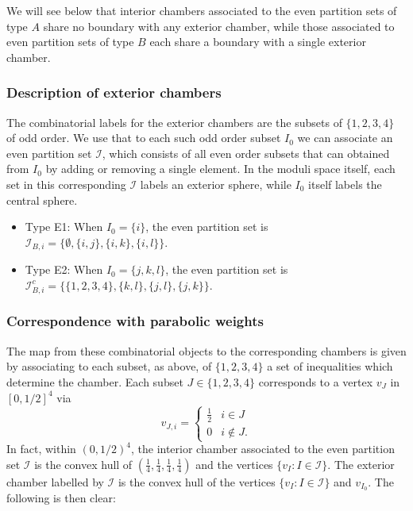 \documentclass[12pt,letterpaper,reqno]{amsart}
\theoremstyle{remark}
\theoremstyle{definition}
\numberwithin{thm}{section}
\numberwithin{equation}{section}
\numberwithin{figure}{section}
\newcommand{\cI}{\ensuremath{\mathcal I}}
\begin{document}
We will see below that interior chambers associated to the even partition sets of type $A$ share no boundary with any exterior chamber, while those
associated to even partition sets of type $B$ each share a boundary with a single exterior chamber. 

\subsubsection{Description of exterior chambers}\label{sec:exteriorchambers} The combinatorial labels for the exterior chambers are the subsets 
of $\{1, 2, 3, 4\}$ of odd order.   
We use that to each such odd order subset $I_0$ we can associate an even partition set $\mathcal{I}$, which consists of all even order subsets that can obtained 
from $I_0$ by adding or removing a single element.  In the moduli space itself, each set in this corresponding $\mathcal{I}$ labels an exterior sphere, while $I_0$
itself labels the central sphere.

\begin{itemize}
\item Type E1: When $I_0=\{i\}$, the even partition set is $\cI_{B,i}=\{\emptyset, \{i, j\}, \{i, k\}, \{i, l\}\}$. 
\item Type E2: When $I_0=\{j, k, l\}$, the even partition set is $\cI_{B,i}^c=\{\{1, 2, 3, 4\}, \{k, l\}, \{j, l\}, \{j, k\}\}$. 
\end{itemize}

\subsubsection{Correspondence with parabolic weights}
The map from these combinatorial objects to the corresponding chambers is given by associating to each subset, as above, of $\{1, 2, 3,4\}$ 
a set of inequalities which determine the chamber.  Each subset $J \in \{1,2,3,4\}$ corresponds to a vertex $v_J$ in $[0,1/2]^4$ via
\begin{equation}\label{eq:vI}
v_{J,i} = \begin{cases} \frac{1}{2} & i \in J \\ 0 & i \notin J. 
\end{cases}\end{equation}
In  fact, within $(0,1/2)^4$, the interior chamber associated to the even partition set $\mathcal I$ 
is the convex hull of $(\frac{1}{4}, \frac{1}{4}, \frac{1}{4}, \frac{1}{4})$ and the vertices $\{v_I: I \in \mathcal{I}\}$.
The exterior chamber labelled by $\mathcal{I}$ is the convex hull of the vertices $\{v_I: I \in \mathcal{I}\}$ and $v_{I_0}$.
The following is then clear:
\end{document}
